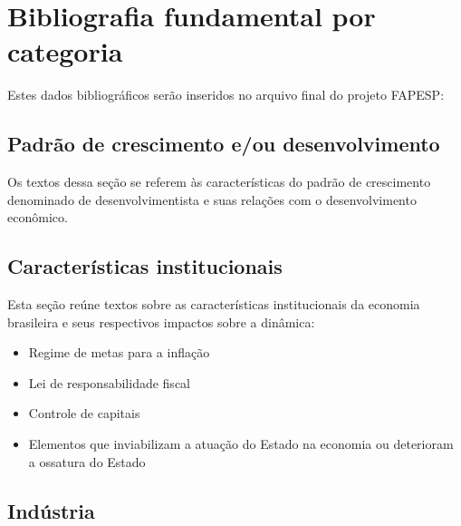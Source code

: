 \documentclass[12pt]{report}
\begin{document}
	
{\let\clearpage\relax \chapter{Bibliografia fundamental por categoria}}

Estes dados bibliográficos serão inseridos no arquivo final do projeto FAPESP:

\section{Padrão de crescimento e/ou desenvolvimento}

Os textos dessa seção se referem às características do padrão de crescimento denominado de desenvolvimentista e suas relações com o desenvolvimento econômico.






\section{Características institucionais}

Esta seção reúne textos sobre as características institucionais da economia brasileira e seus respectivos impactos sobre a dinâmica:

\begin{itemize}
\item Regime de metas para a inflação
\item Lei de responsabilidade fiscal
\item Controle de capitais
\item Elementos que inviabilizam a atuação do Estado na economia ou deterioram a ossatura do Estado
\end{itemize}









\section{Indústria}
\end{document}
